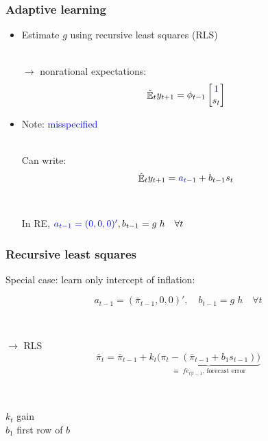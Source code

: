 \documentclass[11pt]{beamer}
\DeclareMathOperator{\E}{\mathbb{E}}
\begin{document}
\begin{frame}
	\frametitle{Adaptive learning}
	\label{adaptive_learning}

\begin{itemize}
\item Estimate $g$ using recursive least squares (RLS)
  \\
  
  \
  
$\rightarrow$ nonrational expectations:
\begin{equation} 
\hat{\E}_t y_{t+1} = \phi_{t-1}\begin{bmatrix} \textcolor{blue}{1} \\ s_{t} \end{bmatrix} \label{PLMcompact}
\end{equation}

\item Note: \textcolor{blue}{misspecified}	\\

\

Can write:
\begin{equation}
\hat{\E}_t y_{t+1} = \textcolor{blue}{a_{t-1}} + b_{t-1}s_t  \label{PLM_fcst_general}
\end{equation}

\

In RE, $\textcolor{blue}{a_{t-1} = (0,0,0)'}, b_{t-1} = g\;h \quad \forall t$
\end{itemize}


\end{frame}

\begin{frame}
	\frametitle{Recursive least squares}
	\label{RLS_special}
Special case: learn only intercept of inflation:

\begin{equation}
a_{t-1} = (\bar{\pi}_{t-1},0,0)', \quad b_{t-1} = g\; h \quad \forall t
\end{equation}

\

$\rightarrow$ RLS
\begin{equation}
\bar{\pi}_{t}  =\bar{\pi}_{t-1} +k_t \underbrace{\big(\pi_{t} -(\bar{\pi}_{t-1}+b_1 s_{t-1}) \big)}_{\equiv \; fe_{t|t-1} \text{, forecast error} } 
\end{equation}
 
 \
 
 $k_t$ gain \\
 $b_1$ first row of $b$
\vfill 

\hyperlink{RLS}{}




\end{frame}
\end{document}
